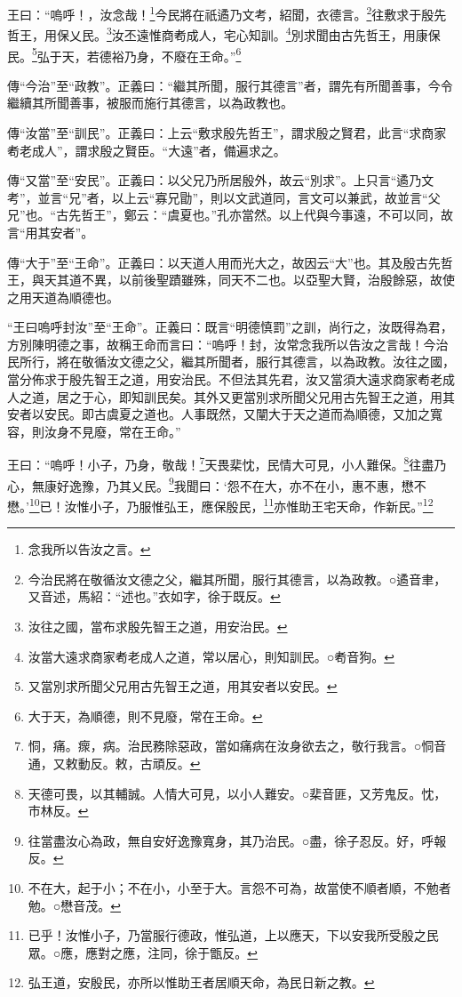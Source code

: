 王曰：“嗚呼！，汝念哉！\footnote{念我所以告汝之言。}今民將在祇遹乃文考，紹聞，衣德言。\footnote{今治民將在敬循汝文德之父，繼其所聞，服行其德言，以為政教。○遹音聿，又音述，馬紹：“述也。”衣如字，徐于既反。}往敷求于殷先哲王，用保乂民。\footnote{汝往之國，當布求殷先智王之道，用安治民。}汝丕遠惟商耇成人，宅心知訓。\footnote{汝當大遠求商家耇老成人之道，常以居心，則知訓民。○耇音狗。}別求聞由古先哲王，用康保民。\footnote{又當別求所聞父兄用古先智王之道，用其安者以安民。}弘于天，若德裕乃身，不廢在王命。”\footnote{大于天，為順德，則不見廢，常在王命。}


{\noindent\zhuan{}\fzbyks 傳“今治”至“政教”。正義曰：“繼其所聞，服行其德言”者，謂先有所聞善事，今令繼續其所聞善事，被服而施行其德言，以為政教也。 \par}

{\noindent\zhuan{}\fzbyks 傳“汝當”至“訓民”。正義曰：上云“敷求殷先哲王”，謂求殷之賢君，此言“求商家耇老成人”，謂求殷之賢臣。“大遠”者，備遍求之。 \par}

{\noindent\zhuan{}\fzbyks 傳“又當”至“安民”。正義曰：以父兄乃所居殷外，故云“別求”。上只言“遹乃文考”，並言“兄”者，以上云“寡兄勖”，則以文武道同，言文可以兼武，故並言“父兄”也。“古先哲王”，鄭云：“虞夏也。”孔亦當然。以上代與今事遠，不可以同，故言“用其安者”。 \par}

{\noindent\zhuan{}\fzbyks 傳“大于”至“王命”。正義曰：以天道人用而光大之，故因云“大”也。其及殷古先哲王，與天其道不異，以前後聖蹟雖殊，同天不二也。以亞聖大賢，治殷餘惡，故使之用天道為順德也。 \par}

{\noindent\shu{}\fzkt “王曰嗚呼封汝”至“王命”。正義曰：既言“明德慎罰”之訓，尚行之，汝既得為君，方別陳明德之事，故稱王命而言曰：“嗚呼！封，汝常念我所以告汝之言哉！今治民所行，將在敬循汝文德之父，繼其所聞者，服行其德言，以為政教。汝往之國，當分佈求于殷先智王之道，用安治民。不但法其先君，汝又當須大遠求商家耇老成人之道，居之于心，即知訓民矣。其外又更當別求所聞父兄用古先智王之道，用其安者以安民。即古虞夏之道也。人事既然，又闡大于天之道而為順德，又加之寬容，則汝身不見廢，常在王命。” \par}

王曰：“嗚呼！小子，乃身，敬哉！\footnote{恫，痛。瘝，病。治民務除惡政，當如痛病在汝身欲去之，敬行我言。○恫音通，又敕動反。敕，古頑反。}天畏棐忱，民情大可見，小人難保。\footnote{天德可畏，以其輔誠。人情大可見，以小人難安。○棐音匪，又芳鬼反。忱，巿林反。}往盡乃心，無康好逸豫，乃其乂民。\footnote{往當盡汝心為政，無自安好逸豫寬身，其乃治民。○盡，徐子忍反。好，呼報反。}我聞曰：‘怨不在大，亦不在小，惠不惠，懋不懋。’\footnote{不在大，起于小；不在小，小至于大。言怨不可為，故當使不順者順，不勉者勉。○懋音茂。}已！汝惟小子，乃服惟弘王，應保殷民，\footnote{已乎！汝惟小子，乃當服行德政，惟弘道，上以應天，下以安我所受殷之民眾。○應，應對之應，注同，徐于甑反。}亦惟助王宅天命，作新民。”\footnote{弘王道，安殷民，亦所以惟助王者居順天命，為民日新之教。}


